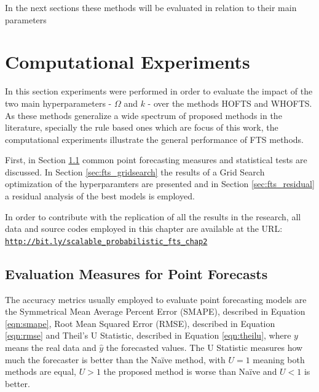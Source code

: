 In the next sections these methods will be evaluated in relation to their main parameters 

%
\section{Computational Experiments}
\label{sec:fts_experiments}

In this section experiments were performed  in order to evaluate the impact of the two main hyperparameters - $\Omega$ and $k$ - over the methods HOFTS and WHOFTS. As these methods generalize a wide spectrum of proposed methods in the literature, specially the rule based ones which are focus of this work, the computational experiments illustrate the general performance of FTS methods.

First, in Section \ref{sec:point_measures} common point forecasting measures and statistical tests are discussed. In Section \ref{sec:fts_gridsearch} the results of a Grid Search optimization of the hyperparamters are presented and in Section \ref{sec:fts_residual} a residual analysis of the best models is employed.

In order to contribute with the replication of all the results in the research, all data and source codes employed in this chapter are available at the URL:
\texttt{\url{http://bit.ly/scalable_probabilistic_fts_chap2}}

%
\subsection{Evaluation Measures for Point Forecasts}
\label{sec:point_measures}


The accuracy metrics usually employed to evaluate point forecasting models are the Symmetrical Mean Average Percent Error (SMAPE), described in Equation \eqref{eqn:smape}, Root Mean Squared Error (RMSE), described in Equation \eqref{eqn:rmse} and Theil's U Statistic, described in Equation \eqref{eqn:theilu},  where $y$ means the real data and $\hat{y}$ the forecasted values. The U Statistic measures how much the forecaster is better than the Na\"{i}ve method, with $U = 1$ meaning both methods are equal, $U > 1$ the proposed method is worse than Na\"{i}ve and $U < 1$ is better.  

